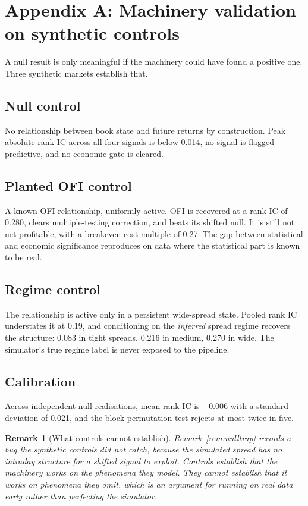 \documentclass[11pt]{scrartcl}
\newtheorem{remark}{Remark}[section]
\begin{document}
\section{Appendix A: Machinery validation on synthetic controls}
\label{sec:controls}

A null result is only meaningful if the machinery could have found a positive one. Three synthetic markets establish that.

\subsection{Null control}
No relationship between book state and future returns by construction. Peak absolute rank IC across all four signals is below 0.014, no signal is flagged predictive, and no economic gate is cleared.

\subsection{Planted OFI control}
A known OFI relationship, uniformly active. OFI is recovered at a rank IC of 0.280, clears multiple-testing correction, and beats its shifted null. It is still not net profitable, with a breakeven cost multiple of 0.27. The gap between statistical and economic significance reproduces on data where the statistical part is known to be real.

\subsection{Regime control}
The relationship is active only in a persistent wide-spread state. Pooled rank IC understates it at 0.19, and conditioning on the \emph{inferred} spread regime recovers the structure: 0.083 in tight spreads, 0.216 in medium, 0.270 in wide. The simulator's true regime label is never exposed to the pipeline.

\subsection{Calibration}
Across independent null realisations, mean rank IC is $-0.006$ with a standard deviation of 0.021, and the block-permutation test rejects at most twice in five.

\begin{remark}[What controls cannot establish]
Remark~\ref{rem:nulltrap} records a bug the synthetic controls did not catch, because the simulated spread has no intraday structure for a shifted signal to exploit. Controls establish that the machinery works on the phenomena they model. They cannot establish that it works on phenomena they omit, which is an argument for running on real data early rather than perfecting the simulator.
\end{remark}
\end{document}
